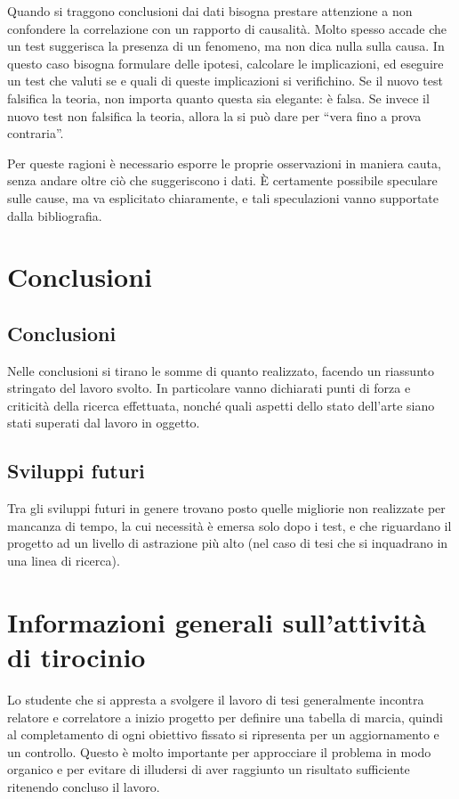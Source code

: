\documentclass[12pt]{report}
\begin{document}
Quando si traggono conclusioni dai dati bisogna prestare attenzione a non confondere la correlazione con un rapporto di causalità. Molto spesso accade che un test suggerisca la presenza di un fenomeno, ma non dica nulla sulla causa. In questo caso bisogna formulare delle ipotesi, calcolare le implicazioni, ed eseguire un test che valuti se e quali di queste implicazioni si verifichino. Se il nuovo test falsifica la teoria, non importa quanto questa sia elegante: è falsa. Se invece il nuovo test non falsifica la teoria, allora la si può dare per ``vera fino a prova contraria''.

Per queste ragioni è necessario esporre le proprie osservazioni in maniera cauta, senza andare oltre ciò che suggeriscono i dati. \`E certamente possibile speculare sulle cause, ma va esplicitato chiaramente, e tali speculazioni vanno supportate dalla bibliografia.

%
%

\chapter{Conclusioni}
\label{cap6}

\section{Conclusioni}

Nelle conclusioni si tirano le somme di quanto realizzato, facendo un riassunto stringato del lavoro svolto. In particolare vanno dichiarati punti di forza e criticità della ricerca effettuata, nonché quali aspetti dello stato dell'arte siano stati superati dal lavoro in oggetto.

\section{Sviluppi futuri}

Tra gli sviluppi futuri in genere trovano posto quelle migliorie non realizzate per mancanza di tempo, la cui necessità è emersa solo dopo i test, e che riguardano il progetto ad un livello di astrazione più alto (nel caso di tesi che si inquadrano in una linea di ricerca).


%
%

\appendix

\chapter{Informazioni generali sull'attività di tirocinio}
Lo studente che si appresta a svolgere il lavoro di tesi generalmente incontra relatore e correlatore a inizio progetto per definire una tabella di marcia, quindi al completamento di ogni obiettivo fissato si ripresenta per un aggiornamento e un controllo. Questo è molto importante per approcciare il problema in modo organico e per evitare di illudersi di aver raggiunto un risultato sufficiente ritenendo concluso il lavoro.
\end{document}
